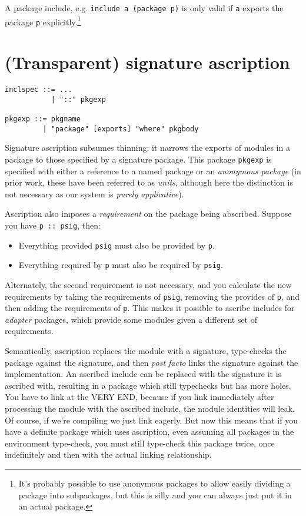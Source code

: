 \documentclass{article}
\newcommand{\Red}[1]{{\color{red} #1}}
\begin{document}
A package include, e.g. \verb|include a (package p)| is only valid if
\verb|a| exports the package \verb|p| explicitly.\footnote{It's probably
possible to use anonymous packages to allow easily dividing a package
into subpackages, but this is silly and you can always just put it
in an actual package.}

\section{(Transparent) signature ascription}

\begin{verbatim}
inclspec ::= ...
           | "::" pkgexp

pkgexp ::= pkgname
         | "package" [exports] "where" pkgbody
\end{verbatim}

Signature ascription subsumes thinning: it narrows the exports
of modules in a package to those specified by a signature
package. This package \verb|pkgexp| is specified with either
a reference to a named package or an \emph{anonymous package}
(in prior work, these have been referred to as \emph{units},
although here the distinction is not necessary as our system
is \emph{purely applicative}).

Ascription also imposes a \emph{requirement} on the package
being abscribed.  Suppose you have \verb|p :: psig|, then:

\begin{itemize}
    \item Everything provided \verb|psig| must also
    be provided by \verb|p|.
    \item Everything required by \verb|p| must also
    be required by \verb|psig|.
\end{itemize}

\Red{Alternately, the second requirement is not necessary, and you
calculate the new requirements by taking the requirements of \texttt{psig},
removing the provides of \texttt{p}, and then adding the requirements of \texttt{p}.
This makes it possible to ascribe includes for \emph{adapter} packages, which
provide some modules given a different set of requirements.}

Semantically, ascription replaces the module with a signature,
type-checks the package against the signature, and then \emph{post
facto} links the signature against the implementation.
An ascribed include can be replaced with the signature
it is ascribed with, resulting in a package which still typechecks
but has more holes.  \Red{You have to link at the VERY END, because
if you link immediately after processing the module with the
ascribed include, the module identities will leak.  Of course, if
we're compiling we just link eagerly.  But now this means that
if you have a definite package which uses ascription, even assuming
all packages in the environment type-check, you must still type-check
this package twice, once indefinitely and then with the actual
linking relationship.}
\end{document}
